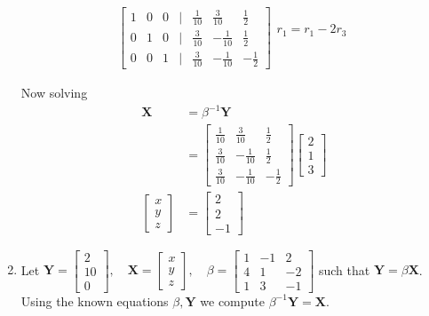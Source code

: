 \documentclass[12pt]{article}
\begin{document}
\begin{enumerate}
\begin{align*}
\begin{bmatrix}
                   1&0&0 &|& \frac{1}{10}&\frac{3}{10}&\frac{1}{2}
                    \\  0 & 1&0  &|& \frac{3}{10}&-\frac{1}{10}&\frac{1}{2}
                    \\0&0&1 &|&\frac{3}{10}&-\frac{1}{10}&-\frac{1}{2}
                \end{bmatrix}\begin{matrix}
                    r_1 = r_1 -2r_3
                    \\ %
                    \\%
                    \\ 
                \end{matrix}
        \end{align*}

         Now solving
        \begin{align*}
            \mathbf{X}&= \beta^{-1} \mathbf{Y}
            \\ &= \begin{bmatrix}
                    \frac{1}{10}&\frac{3}{10}&\frac{1}{2}
                    \\ \frac{3}{10}&-\frac{1}{10}&\frac{1}{2}
                    \\ \frac{3}{10}&-\frac{1}{10}&-\frac{1}{2}
                \end{bmatrix}\begin{bmatrix}
        2\\1\\3 \end{bmatrix}
                \\ \begin{bmatrix}
            x \\ y\\ z
        \end{bmatrix}&= \begin{bmatrix}
                    2
                    \\ 2
                    \\ -1
                \end{bmatrix}
        \end{align*}


    \item Let $\mathbf{Y} = \begin{bmatrix}
        2\\10\\0 \end{bmatrix}, \quad  \mathbf{X} = \begin{bmatrix}
            x \\ y\\ z
        \end{bmatrix}, \quad \beta = \begin{bmatrix}
            1&-1&2 \\ 4&1&-2 \\ 1&3&-1
        \end{bmatrix}$ such that $\mathbf{Y}=\beta\mathbf{X}$. Using the known equations $\beta, \mathbf{Y}$ we compute $\beta^{-1} \mathbf{Y}= \mathbf{X}$.


\end{enumerate}
\end{document}
